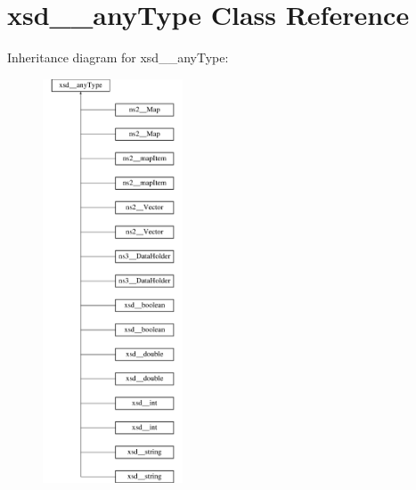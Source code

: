 \hypertarget{classxsd____anyType}{
\section{xsd\_\-\_\-anyType Class Reference}
\label{classxsd____anyType}
}
Inheritance diagram for xsd\_\-\_\-anyType:\begin{figure}[H]
\begin{center}
\leavevmode
\includegraphics[height=12.000000cm]{classxsd____anyType}
\end{center}
\end{figure}

